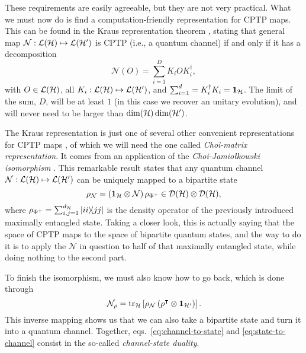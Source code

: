 		These requirements are easily agreeable, but they are not very practical. What we must now do is find a computation-friendly representation for CPTP maps. This can be found in the Kraus representation theorem \cite{wilde_2013_book}, stating that general map $\mathcal{N} : \mathcal{L}(\mathcal{H}) \mapsto \mathcal{L}(\mathcal{H}^\prime)$ is CPTP (i.e., a quantum channel) if and only if it has a decomposition
		$$
			\mathcal{N}(O) = \sum_{i=1}^D K_i O K_i^\dagger ,
		$$
		with $O \in \mathcal{L}(\mathcal{H})$, all $K_i : \mathcal{L}(\mathcal{H}) \mapsto \mathcal{L}(\mathcal{H}^\prime)$, and $\sum_{i=1}^d = K_i^\dagger K_i = \mathbf{1}_{\mathcal{H}}$. The limit of the sum, $D$, will be at least $1$ (in this case we recover an unitary evolution), and will never need to be larger than $\text{dim}(\mathcal{H}) \,\text{dim}(\mathcal{H}^\prime)$.
		
		The Kraus representation is just one of several other convenient representations for CPTP maps \cite{wood_2015_tensor}, of which we will need the one called \emph{Choi-matrix representation}. It comes from an application of the \emph{Choi-Jamiołkowski isomorphism} \cite{jamiolkowski,jiang_2013_channelstate}. This remarkable result states that any quantum channel $\mathcal{N} : \mathcal{L}(\mathcal{H}) \mapsto \mathcal{L}(\mathcal{H}^\prime)$ can be uniquely mapped to a bipartite state
		\begin{equation}
			\rho_{\mathcal{N}} = \left(\mathbf{1}_{\mathcal{H}} \otimes \mathcal{N} \right) \rho_{\Phi^+} \in \mathcal{D}(\mathcal{H}) \otimes \mathcal{D}(\mathcal{H}) ,
			\label{eq:channel-to-state}
		\end{equation}
		where $\rho_{\Phi^+} = \sum_{i,j=1}^{d_{\mathcal{H}}} \ketbra{ii}{jj}$ is the density operator of the previously introduced maximally entangled state. Taking a closer look, this is actually saying that the space of CPTP maps to the space of bipartite quantum states, and the way to do it is to apply the $\mathcal{N}$ in question to half of that maximally entangled state, while doing nothing to the second part.
		
		To finish the isomorphism, we must also know how to go back, which is done through
		\begin{equation}
			\mathcal{N}_\rho = \text{tr}_{\mathcal{H}}\left[ \rho_{\mathcal{N}} \left( \rho^\intercal \otimes \mathbf{1}_{\mathcal{H}^\prime} \right) \right] .
			\label{eq:state-to-channel}
		\end{equation}
		This inverse mapping shows us that we can also take a bipartite state and turn it into a quantum channel. Together, eqs.~\eqref{eq:channel-to-state} and \eqref{eq:state-to-channel} consist in the so-called \emph{channel-state duality}.
		
